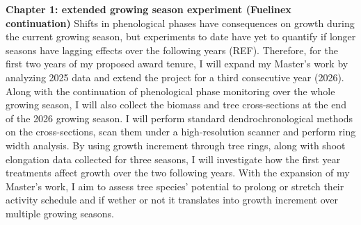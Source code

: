 \documentclass[12pt]{article}
\begin{document}
\textbf{Chapter 1: extended growing season experiment (Fuelinex continuation)}
Shifts in phenological phases have consequences on growth during the current growing season, but experiments to date have yet to quantify if longer seasons have lagging effects over the following years (REF). Therefore, for the first two years of my proposed award tenure, I will expand my Master's work by analyzing 2025 data and extend the project for a third consecutive year (2026). Along with the continuation of phenological phase monitoring over the whole growing season, I will also collect the biomass and tree cross-sections at the end of the 2026 growing season. I will perform standard dendrochronological methods on the cross-sections, scan them under a high-resolution scanner and perform ring width analysis. By using growth increment through tree rings, along with shoot elongation data collected for three seasons, I will investigate how the first year treatments affect growth over the two following years. With the expansion of my Master's work, I aim to assess tree species’ potential to prolong or stretch their activity schedule and if wether or not it translates into growth increment over multiple growing seasons. \\
\end{document}
